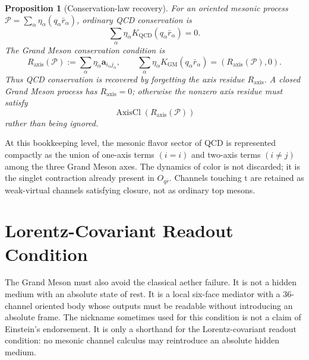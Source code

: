 \documentclass[11pt]{article}
\theoremstyle{definition}
\theoremstyle{plain}
\newtheorem{proposition}[definition]{Proposition}
\DeclareMathOperator{\AxisCl}{AxisCl}
\newcommand{\qt}{\mathrm t}
\begin{document}
\begin{proposition}[Conservation-law recovery]
For an oriented mesonic process
\(\mathcal P=\sum_{\alpha}\eta_{\alpha}(q_\alpha\bar r_\alpha)\), ordinary
QCD conservation is
\[
  \sum_{\alpha}\eta_{\alpha}
  K_{\mathrm{QCD}}(q_\alpha\bar r_\alpha)=0 .
\]
The Grand Meson conservation condition is
\[
  R_{\mathrm{axis}}(\mathcal P)
  :=
  \sum_{\alpha}\eta_{\alpha}\mathbf a_{i_\alpha j_\alpha},
  \qquad
  \sum_{\alpha}\eta_{\alpha}
  K_{\mathrm{GM}}(q_\alpha\bar r_\alpha)
  =
  (R_{\mathrm{axis}}(\mathcal P),0).
\]
Thus QCD conservation is recovered by forgetting the axis residue
\(R_{\mathrm{axis}}\).  A closed Grand Meson process has
\(R_{\mathrm{axis}}=0\); otherwise the nonzero axis residue must satisfy
\[
  \AxisCl(R_{\mathrm{axis}}(\mathcal P))
\]
rather than being ignored.
\end{proposition}

At this bookkeeping level, the mesonic flavor sector of QCD is represented
compactly as the union of one-axis terms \((i=i)\) and two-axis terms
\((i\ne j)\) among the three Grand Meson axes.  The dynamics of color is not discarded; it is the
singlet contraction already present in \(O_{q\bar r}\).  Channels touching
\(\qt\) are retained as weak-virtual channels satisfying closure, not as ordinary
top mesons.

\section{Lorentz-Covariant Readout Condition}

The Grand Meson must also avoid the classical aether failure.  It is not a
hidden medium with an absolute state of rest.  It is a local six-face
mediator with a \(36\)-channel oriented body whose outputs must be readable
without introducing an absolute frame.
The nickname sometimes used for this condition is not a claim of Einstein's
endorsement.  It is only a shorthand for the Lorentz-covariant readout
condition: no mesonic channel calculus may reintroduce an absolute hidden
medium.
\end{document}
